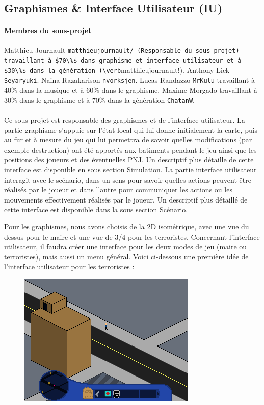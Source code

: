 \documentclass[a4paper,10pt]{article}
\begin{document}
\subsection{Graphismes \& Interface Utilisateur (IU)}
\paragraph{Membres du sous-projet} Matthieu Journault \verb!matthieujournault/ (Responsable du sous-projet) travaillant à $70\%$ dans graphisme et interface utilisateur et à $30\%$ dans la génération (\verb!matthieujournault!). Anthony Lick \verb!Seyaryuki!. Naina Razakarison \verb!nvorksjen!. Lucas Randazzo \verb!MrKulu! travaillant à $40\%$ dans la musique et à $60\%$ dans le graphisme. Maxime Morgado travaillant à  $30\%$ dans le graphisme et à  $70\%$ dans la génération \verb!ChatanW!.
\paragraph{} Ce sous-projet est responsable des graphismes et de l'interface utilisateur. 
La partie graphisme s'appuie sur l'état local qui lui donne initialement la carte, puis au fur et à mesure du jeu qui lui permettra de savoir quelles modifications (par exemple destruction) ont été apportés aux batiments pendant le jeu ainsi que les positions des joueurs et des éventuelles PNJ. Un descriptif plus détaille de cette interface est disponible en sous section Simulation.
La partie interface utilisateur interagit avec le scénario, dans un sens pour savoir quelles actions peuvent être réalisés par le joueur et dans l'autre pour communiquer les actions ou les mouvements effectivement réalisés par le joueur. Un descriptif plus détaillé de cette interface est disponible dans la sous section Scénario.

Pour les graphismes, nous avons choisis de la 2D isométrique, avec une vue du dessus pour le maire et une vue de 3/4 pour les terroristes. 
Concernant l'interface utilisateur, il faudra créer une interface pour les deux modes de jeu (maire ou terroristes), mais aussi un menu général. 
Voici ci-dessous une première idée de l'interface utilisateur pour les terroristes :
\begin{figure}[h]
\centering
 \includegraphics[width = 0.5\linewidth]{TS2014.png}
\end{figure}
\end{document}
